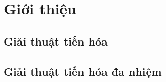\chapter{Giới thiệu}
\label{chap:introduction}

\section{Giải thuật tiến hóa}

\newpage
\section{Giải thuật tiến hóa đa nhiệm}
